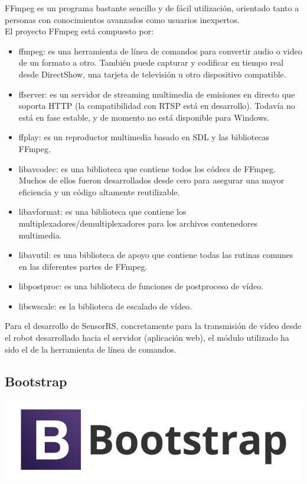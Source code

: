 FFmpeg es un programa bastante sencillo y de fácil utilización, orientado tanto a personas con conocimientos avanzados como usuarios inexpertos. \\

El proyecto FFmpeg está compuesto por:\\

\begin{itemize}
 \item ffmpeg: es una herramienta de línea de comandos para convertir audio o video de un formato a otro. También puede capturar y codificar en tiempo real desde DirectShow, una tarjeta de televisión u otro dispositivo compatible.
 \item ffserver: es un servidor de streaming multimedia de emisiones en directo que soporta HTTP (la compatibilidad con RTSP está en desarrollo). Todavía no está en fase estable, y de momento no está disponible para Windows.
 \item ffplay: es un reproductor multimedia basado en SDL y las bibliotecas FFmpeg.
 \item libavcodec: es una biblioteca que contiene todos los códecs de FFmpeg. Muchos de ellos fueron desarrollados desde cero para asegurar una mayor eficiencia y un código altamente reutilizable.
 \item libavformat: es una biblioteca que contiene los multiplexadores/demultiplexadores para los archivos contenedores multimedia.
 \item libavutil: es una biblioteca de apoyo que contiene todas las rutinas comunes en las diferentes partes de FFmpeg.
 \item libpostproc: es una biblioteca de funciones de postproceso de vídeo.
 \item libswscale: es la biblioteca de escalado de vídeo.
\end{itemize}

Para el desarrollo de SensorRS, concretamente para la transmisión de vídeo desde el robot desarrollado hacia el servidor (aplicación web), el módulo utilizado ha sido el de la herramienta de línea de comandos.


\subsection{Bootstrap}


\begin{center}
\includegraphics[scale=0.3]{imagenes/bootstrap-logo.jpg}
\end{center}

